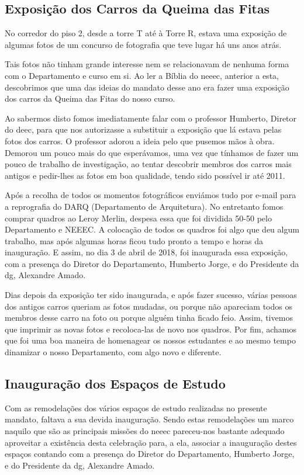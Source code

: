 
\subsection{Exposição dos Carros da Queima das Fitas}

No corredor do piso 2, desde a torre T até à Torre R, estava uma exposição de algumas fotos de um concurso de fotografia que teve lugar há uns anos atrás.

Tais fotos não tinham grande interesse nem se relacionavam de nenhuma forma com o Departamento e curso em si. Ao ler a Bíblia do \acrshort{neeec}, anterior a esta, descobrimos que uma das ideias do mandato desse ano era fazer uma exposição dos carros da Queima das Fitas do nosso curso.

Ao sabermos disto fomos imediatamente falar com o professor Humberto, Diretor do \acrshort{deec}, para que nos autorizasse a substituir a exposição que lá estava pelas fotos dos carros. O professor adorou a ideia pelo que pusemos mãos à obra.
Demorou um pouco mais do que esperávamos, uma vez que tínhamos de fazer um pouco de trabalho de investigação, ao tentar descobrir membros dos carros mais antigos e pedir-lhes as fotos em boa qualidade, tendo sido possível ir até 2011. 

Após a recolha de todos os momentos fotográficos enviámos tudo por e-mail para a reprografia do DARQ (Departamento de Arquitetura). No entretanto fomos comprar quadros ao Leroy Merlin, despesa essa que foi dividida 50-50 pelo Departamento e NEEEC.
A colocação de todos os quadros foi algo que deu algum trabalho, mas após algumas horas ficou tudo pronto a tempo e horas da inauguração. E assim, no dia 3 de abril de 2018, foi inaugurada essa exposição, com a presença do Diretor do Departamento, Humberto Jorge, e do Presidente da \acrshort{dg}, Alexandre Amado.

Dias depois da exposição ter sido inaugurada, e após fazer sucesso, várias pessoas dos antigos carros queriam as fotos mudadas, ou porque não apareciam todos os membros desse carro na foto ou porque alguém tinha ficado feio. Assim, tivemos que imprimir as novas fotos e recoloca-las de novo nos quadros. 
Por fim, achamos que foi uma boa maneira de homenagear os nossos estudantes e ao mesmo tempo dinamizar o nosso Departamento, com algo novo e diferente.

\subsection{Inauguração dos Espaços de Estudo}

Com as remodelações dos vários espaços de estudo realizadas no presente mandato, faltava a sua devida inauguração. Sendo estas remodelações um marco naquilo que são as principais missões do \acrshort{neeec} pareceu-nos bastante adequado aproveitar a existência desta celebração para, a ela, associar a inauguração destes espaços contando com a presença do Diretor do Departamento, Humberto Jorge, e do Presidente da \acrshort{dg}, Alexandre Amado.